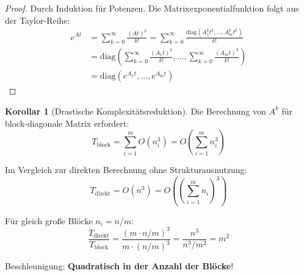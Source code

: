 \documentclass[a4paper,12pt]{report}
\theoremstyle{definition}
\newtheorem{korollar}{Korollar}
\begin{document}
	\begin{proof}
		Durch Induktion für Potenzen. Die Matrixexponentialfunktion folgt aus der Taylor-Reihe:
		\begin{align}
			e^{At} &= \sum_{k=0}^\infty \frac{(At)^k}{k!} = \sum_{k=0}^\infty \frac{\text{diag}(A_1^k t^k, \ldots, A_m^k t^k)}{k!} \\
			&= \text{diag}\left(\sum_{k=0}^\infty \frac{(A_1 t)^k}{k!}, \ldots, \sum_{k=0}^\infty \frac{(A_m t)^k}{k!}\right) \\
			&= \text{diag}(e^{A_1 t}, \ldots, e^{A_m t})
		\end{align}
	\end{proof}
	
	\begin{korollar}[Drastische Komplexitätsreduktion]
		Die Berechnung von $A^k$ für block-diagonale Matrix erfordert:
		\[
		T_{\text{block}} = \sum_{i=1}^m O(n_i^3) = O\left(\sum_{i=1}^m n_i^3\right)
		\]
		
		Im Vergleich zur direkten Berechnung ohne Strukturausnutzung:
		\[
		T_{\text{direkt}} = O(n^3) = O\left(\left(\sum_{i=1}^m n_i\right)^3\right)
		\]
		
		Für gleich große Blöcke $n_i = n/m$:
		\[
		\frac{T_{\text{direkt}}}{T_{\text{block}}} = \frac{(m \cdot n/m)^3}{m \cdot (n/m)^3} = \frac{n^3}{n^3/m^2} = m^2
		\]
		
		Beschleunigung: \textbf{Quadratisch in der Anzahl der Blöcke}!
	\end{korollar}
	
\end{document}

